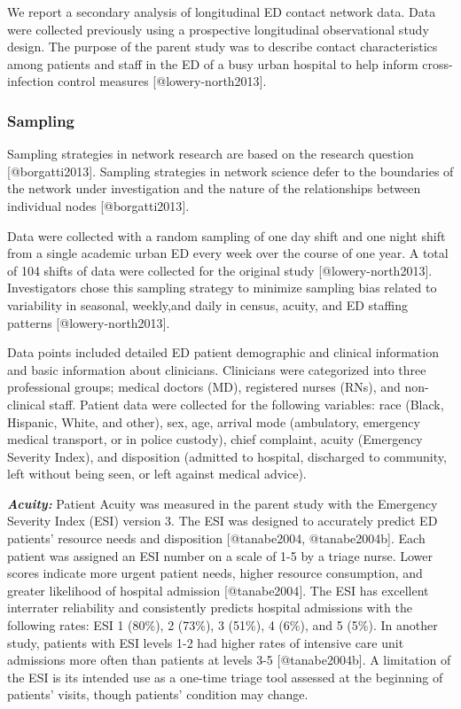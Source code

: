 \documentclass[
]{article}
\begin{document}
We report a secondary analysis of longitudinal ED contact network data.
Data were collected previously using a prospective longitudinal
observational study design. The purpose of the parent study was to
describe contact characteristics among patients and staff in the ED of a
busy urban hospital to help inform cross-infection control measures
{[}@lowery-north2013{]}.

\hypertarget{sampling}{%
\subsubsection{Sampling}\label{sampling}}

Sampling strategies in network research are based on the research
question {[}@borgatti2013{]}. Sampling strategies in network science
defer to the boundaries of the network under investigation and the
nature of the relationships between individual nodes
{[}@borgatti2013{]}.

Data were collected with a random sampling of one day shift and one
night shift from a single academic urban ED every week over the course
of one year. A total of 104 shifts of data were collected for the
original study {[}@lowery-north2013{]}. Investigators chose this
sampling strategy to minimize sampling bias related to variability in
seasonal, weekly,and daily in census, acuity, and ED staffing patterns
{[}@lowery-north2013{]}.

Data points included detailed ED patient demographic and clinical
information and basic information about clinicians. Clinicians were
categorized into three professional groups; medical doctors (MD),
registered nurses (RNs), and non-clinical staff. Patient data were
collected for the following variables: race (Black, Hispanic, White, and
other), sex, age, arrival mode (ambulatory, emergency medical transport,
or in police custody), chief complaint, acuity (Emergency Severity
Index), and disposition (admitted to hospital, discharged to community,
left without being seen, or left against medical advice).

\textbf{\emph{Acuity:}} Patient Acuity was measured in the parent study
with the Emergency Severity Index (ESI) version 3. The ESI was designed
to accurately predict ED patients' resource needs and disposition
{[}@tanabe2004, @tanabe2004b{]}. Each patient was assigned an ESI number
on a scale of 1-5 by a triage nurse. Lower scores indicate more urgent
patient needs, higher resource consumption, and greater likelihood of
hospital admission {[}@tanabe2004{]}. The ESI has excellent interrater
reliability and consistently predicts hospital admissions with the
following rates: ESI 1 (80\%), 2 (73\%), 3 (51\%), 4 (6\%), and 5 (5\%).
In another study, patients with ESI levels 1-2 had higher rates of
intensive care unit admissions more often than patients at levels 3-5
{[}@tanabe2004b{]}. A limitation of the ESI is its intended use as a
one-time triage tool assessed at the beginning of patients' visits,
though patients' condition may change.
\end{document}
